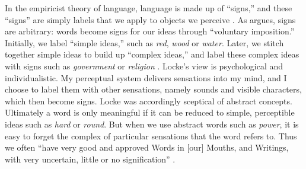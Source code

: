 \documentclass[
  Crown,
  times,
  sageh]{sagej}
\begin{document}
In the empiricist theory of language, language is made up of ``signs,''
and these ``signs'' are simply labels that we apply to objects we
perceive \citep[159]{bergheaud_empiricism_1985}. As
\citet[405]{locke_essay_1975} argues, signs are arbitrary: words become
signs for our ideas through ``voluntary imposition.'' Initially, we
label ``simple ideas,'' such as \emph{red}, \emph{wood} or \emph{water}.
Later, we stitch together simple ideas to build up ``complex ideas,''
and label these complex ideas with signs such as \emph{government} or
\emph{religion} \citeyearpar[§3.2]{locke_essay_1975}. Locke's view is
psychological and individualistic. My perceptual system delivers
sensations into my mind, and I choose to label them with other
sensations, namely sounds and visible characters, which then become
signs. Locke was accordingly sceptical of abstract concepts. Ultimately
a word is only meaningful if it can be reduced to simple, perceptible
ideas such as \emph{hard} or \emph{round}. But when we use abstract
words such as \emph{power}, it is easy to forget the complex of
particular sensations that the word refers to. Thus we often ``have very
good and approved Words in {[}our{]} Mouths, and Writings, with very
uncertain, little or no signification''
\citeyearpar[438]{locke_essay_1975}.
\end{document}
